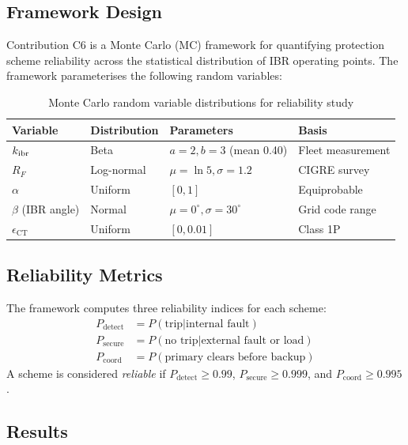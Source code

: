 \subsection{Framework Design}

Contribution C6 is a Monte Carlo (MC) framework for quantifying protection
scheme reliability across the statistical distribution of IBR operating points.
The framework parameterises the following random variables:

\begin{table}[htbp]
\caption{Monte Carlo random variable distributions for reliability study}
\label{tab:ch5_mc_params}
\begin{tabularx}{\textwidth}{@{}lXXX@{}}
\toprule
Variable & Distribution & Parameters & Basis \\
\midrule
$k_\mathrm{ibr}$ & Beta & $a=2, b=3$ (mean 0.40) & Fleet measurement \\
$R_F$ & Log-normal & $\mu=\ln 5, \sigma=1.2$ & CIGRE survey \\
$\alpha$ & Uniform & $[0, 1]$ & Equiprobable \\
$\beta$ (IBR angle) & Normal & $\mu=0^\circ{}, \sigma=30^\circ{}$ & Grid code range \\
$\epsilon_\mathrm{CT}$ & Uniform & $[0, 0.01]$ & Class 1P \\
\bottomrule
\end{tabularx}
\end{table}

\subsection{Reliability Metrics}

The framework computes three reliability indices for each scheme:
\begin{align}
  P_\mathrm{detect} &= P(\text{trip} | \text{internal fault})
  \label{eq:ch5_pdetect} \\
  P_\mathrm{secure} &= P(\text{no trip} | \text{external fault or load})
  \label{eq:ch5_psecure} \\
  P_\mathrm{coord} &= P(\text{primary clears before backup})
  \label{eq:ch5_pcoord}
\end{align}
A scheme is considered \emph{reliable} if $P_\mathrm{detect} \geq 0.99$,
$P_\mathrm{secure} \geq 0.999$, and $P_\mathrm{coord} \geq 0.995$.

\subsection{Results}

